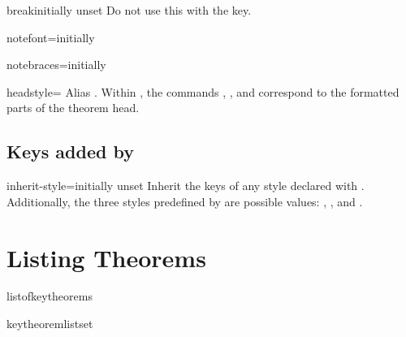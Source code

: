 \documentclass{ltxdoc}
\newcommand{\ttbraces}[1]{\braces{\texttt{#1}}}
\begin{document}
\begin{docKey}{break}{}{initially unset}
Do not use this with the  key.
\end{docKey}

\begin{docKey}{notefont}{=}{initially }

\end{docKey}

\begin{docKey}{notebraces}{=}{initially \ttbraces{(}\ttbraces{)}}

\end{docKey}

\begin{docKey}{headstyle}{=\textbar{}\textbar{}}{}
Alias . Within , the commands , , and  correspond to the formatted parts of the theorem head.
\end{docKey}

\subsection{Keys added by }

\begin{docKey}{inherit-style}{=}{initially unset}
Inherit the keys of any style declared with . Additionally, the three styles predefined by  are possible values: , , and .
\end{docKey}

\section{Listing Theorems}

\begin{docCommand}{listofkeytheorems}{}

\end{docCommand}

\begin{docCommand}{keytheoremlistset}{}

\end{docCommand}
\begin{keythmscode}[]
\listofkeytheorems
\end{keythmscode}
\end{document}

